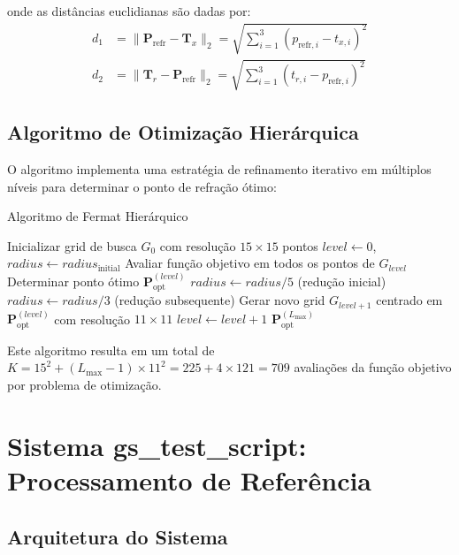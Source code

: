 \documentclass[12pt,a4paper]{article}
\begin{document}
onde as distâncias euclidianas são dadas por:
\begin{align}
d_1 &= \|\mathbf{P}_{\text{refr}} - \mathbf{T}_x\|_2 = \sqrt{\sum_{i=1}^{3}(p_{\text{refr},i} - t_{x,i})^2} \\
d_2 &= \|\mathbf{T}_r - \mathbf{P}_{\text{refr}}\|_2 = \sqrt{\sum_{i=1}^{3}(t_{r,i} - p_{\text{refr},i})^2}
\end{align}

\subsection{Algoritmo de Otimização Hierárquica}

O algoritmo implementa uma estratégia de refinamento iterativo em múltiplos níveis para determinar o ponto de refração ótimo:

\begin{algorithm}[H]
\caption{Algoritmo de Fermat Hierárquico}
\begin{algorithmic}[1]
\STATE Inicializar grid de busca $G_0$ com resolução $15 \times 15$ pontos
\STATE $level \leftarrow 0$, $radius \leftarrow radius_{\text{initial}}$
    \STATE Avaliar função objetivo em todos os pontos de $G_{level}$
    \STATE Determinar ponto ótimo $\mathbf{P}_{\text{opt}}^{(level)}$
        \STATE $radius \leftarrow radius / 5$ (redução inicial)
    \ELSE
        \STATE $radius \leftarrow radius / 3$ (redução subsequente)
    \ENDIF
    \STATE Gerar novo grid $G_{level+1}$ centrado em $\mathbf{P}_{\text{opt}}^{(level)}$ com resolução $11 \times 11$
    \STATE $level \leftarrow level + 1$
\ENDWHILE
\RETURN $\mathbf{P}_{\text{opt}}^{(L_{\text{max}})}$
\end{algorithmic}
\end{algorithm}

Este algoritmo resulta em um total de $K = 15^2 + (L_{\text{max}}-1) \times 11^2 = 225 + 4 \times 121 = 709$ avaliações da função objetivo por problema de otimização.

\section{Sistema gs\_test\_script: Processamento de Referência}

\subsection{Arquitetura do Sistema}
\end{document}
